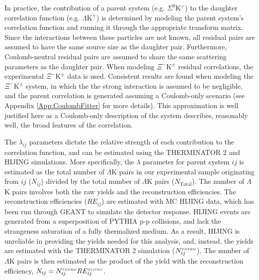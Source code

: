 \documentclass[ALICE,manyauthors]{cernphprep}
\newcommand{\KchP}{$\mathrm{K^{+}}$\xspace}
\newcommand{\LamK}{$\Lambda$K\xspace}
\newcommand{\LamKchP}{$\Lambda\mathrm{K^{+}}$\xspace}
\newcommand{\XiKpm}{$\Xi^{-}\mathrm{K^{\pm}}$\xspace}
\begin{document}
In practice, the contribution of a parent system (e.g. $\Sigma^{0}$\KchP) to the daughter correlation function (e.g. \LamKchP) is determined by modeling the parent system's correlation function and running it through the appropriate transform matrix.
Since the interactions between these particles are not known, all residual pairs are assumed to have the same source size as the daughter pair.
Furthermore, Coulomb-neutral residual pairs are assumed to share the same scattering parameters as the daughter pair.
When modeling \XiKpm residual correlations, the experimental \XiKpm data is used. 
Consistent results are found when modeling the \XiKpm system, in which the the strong interaction is assumed to be negligible, and the parent correlation is generated assuming a Coulomb-only scenario (see Appendix \ref{App:CoulombFitter} for more details).
This approximation is well justified here as a Coulomb-only description of the system describes, reasonably well, the broad features of the correlation.   

The $\lambda_{ij}$ parameters dictate the relative strength of each contribution to the correlation function, and can be estimated using the THERMINATOR 2 and HIJING simulations.
More specifically, the $\lambda$ parameter for parent system $ij$ is estimated as the total number of \LamK pairs in our experimental sample originating from $ij$ ($N_{ij}$) divided by the total number of \LamK pairs ($N_{\mathrm{Total}}$).
The number of \LamK pairs involves both the raw yields and the reconstruction efficiencies.
The reconstruction efficiencies ($RE_{ij}$) are estimated with MC HIJING data, which has been run through GEANT to simulate the detector response.
HIJING events are generated from a superposition of PYTHIA p-p collisions, and lack the strangeness saturation of a fully thermalized medium.
As a result, HIJING is unreliable in providing the yields needed for this analysis, and, instead, the yields are estimated with the THERMINATOR 2 simulation ($N_{ij}^{\scaleto{THERM}{3pt}}$).
The number of \LamK pairs is then estimated as the product of the yield with the reconstruction efficiency, $N_{ij} = N_{ij}^{\scaleto{THERM}{3pt}}RE_{ij}^{\scaleto{HIJING}{3pt}}$.
\end{document}
